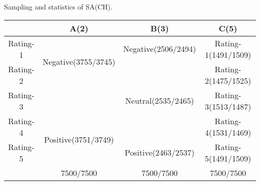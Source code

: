 \centering
\caption{Sampling and statistics of SA(CH).}
\begin{tabular}{|c|c|c|c|}
\hline
         & A(2)                                 & B(3)                & C(5)                \\ \hline
Rating-1 & \multirow{2}{*}{Negative(3755/3745)} & Negative(2506/2494) & Rating-1(1491/1509) \\ \cline{1-1} \cline{3-4} 
Rating-2 &                                      &                     & Rating-2(1475/1525) \\ \hline
Rating-3 &                                      & Neutral(2535/2465)  & Rating-3(1513/1487) \\ \hline
Rating-4 & \multirow{2}{*}{Positive(3751/3749)} &                     & Rating-4(1531/1469) \\ \cline{1-1} \cline{3-4} 
Rating-5 &                                      & Positive(2463/2537) & Rating-5(1491/1509) \\ \hline
         & 7500/7500                            & 7500/7500           & 7500/7500           \\ \hline
\end{tabular}
